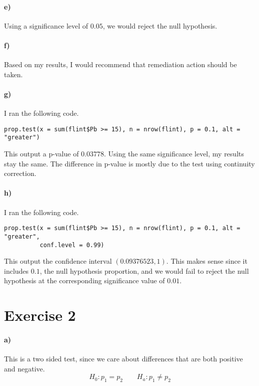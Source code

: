 \documentclass[12pt]{article}
\begin{document}
\paragraph{e)}

Using a significance level of \(0.05\), we would reject the null hypothesis.

\paragraph{f)}

Based on my results, I would recommend that remediation action should be taken.

\paragraph{g)}

I ran the following code.
\scriptsize
\begin{verbatim}
prop.test(x = sum(flint$Pb >= 15), n = nrow(flint), p = 0.1, alt = "greater")
\end{verbatim}
\normalsize
This output a p-value of \(0.03778\). Using the same significance level, my results stay the same.
The difference in p-value is mostly due to the test using continuity correction.

\paragraph{h)}

I ran the following code.
\scriptsize
\begin{verbatim}
prop.test(x = sum(flint$Pb >= 15), n = nrow(flint), p = 0.1, alt = "greater",
          conf.level = 0.99)
\end{verbatim}
\normalsize
This output the confidence interval \((0.09376523,1)\). This makes sense since it includes
\(0.1\), the null hypothesis proportion, and we would fail to reject the null hypothesis at the
corresponding significance value of \(0.01\).

\section*{Exercise 2}

\paragraph{a)}

This is a two sided test, since we care about differences that are both positive and negative.
\[H_0:p_1=p_2\qquad H_a:p_1\neq p_2\]
\end{document}
